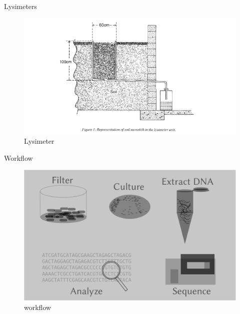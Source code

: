 \documentclass[17pt,aspectratio=169]{beamer}
\begin{document}
\begin{frame}[label={sec:org47ec813}]{Lysimeters}
\begin{figure}[htbp]
\centering
\includegraphics[width=\textwidth]{./lys_photos/RyanFanning2.png}
\caption{\label{fig:org2165260}
Lysimeter}
\end{figure}
\end{frame}



\begin{frame}[label={sec:orge1553c3}]{Workflow}
\begin{figure}[htbp]
\centering
\includegraphics[width=.86\textwidth]{./frequentFigs/workflow_v1.pdf}
\caption{\label{fig:org1844168}
workflow}
\end{figure}
\end{frame}
\end{document}
